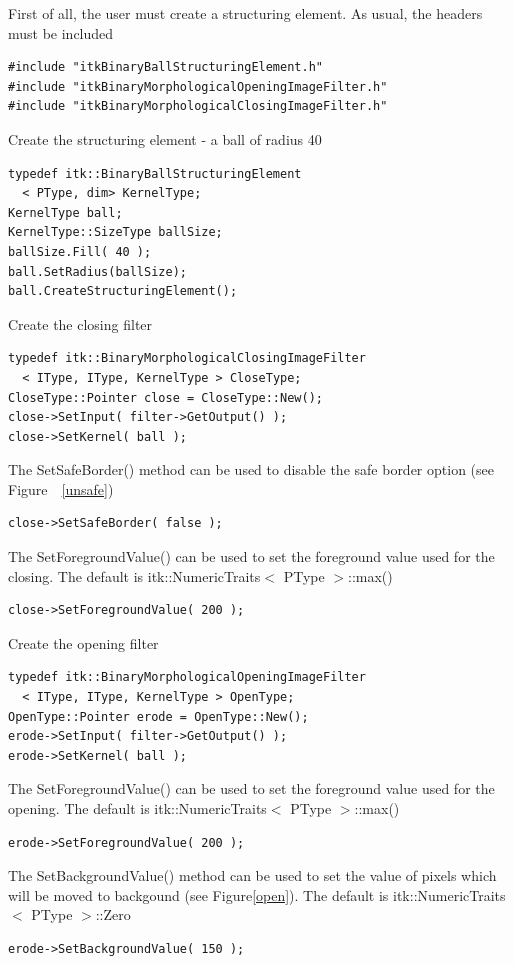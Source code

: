 \documentclass[IJ]{cesj}
\begin{document}
First of all, the user must create a structuring element. As usual, the headers must be included

\begin{lstlisting}
#include "itkBinaryBallStructuringElement.h"
#include "itkBinaryMorphologicalOpeningImageFilter.h"
#include "itkBinaryMorphologicalClosingImageFilter.h"
\end{lstlisting}
Create the structuring element - a ball of radius 40
\begin{lstlisting}
typedef itk::BinaryBallStructuringElement
  < PType, dim> KernelType;
KernelType ball;
KernelType::SizeType ballSize;
ballSize.Fill( 40 );
ball.SetRadius(ballSize);
ball.CreateStructuringElement();
\end{lstlisting}
Create the closing filter
\begin{lstlisting}
typedef itk::BinaryMorphologicalClosingImageFilter
  < IType, IType, KernelType > CloseType;
CloseType::Pointer close = CloseType::New();
close->SetInput( filter->GetOutput() );
close->SetKernel( ball );
\end{lstlisting}
The SetSafeBorder() method can be used to disable the safe border option (see Figure~~\ref{unsafe})
\begin{lstlisting}
close->SetSafeBorder( false );
\end{lstlisting}
The SetForegroundValue() can be used to set the foreground value used for the closing. The default is itk::NumericTraits$<$ PType $>$::max()
\begin{lstlisting}
close->SetForegroundValue( 200 );
\end{lstlisting}
Create the opening filter
\begin{lstlisting}
typedef itk::BinaryMorphologicalOpeningImageFilter
  < IType, IType, KernelType > OpenType;
OpenType::Pointer erode = OpenType::New();
erode->SetInput( filter->GetOutput() );
erode->SetKernel( ball );
\end{lstlisting}
The SetForegroundValue() can be used to set the foreground value used for the opening. The default is itk::NumericTraits$<$ PType $>$::max()
\begin{lstlisting}
erode->SetForegroundValue( 200 );
\end{lstlisting}
The SetBackgroundValue() method can be used to set the value of pixels which will be moved to backgound (see Figure\ref{open}). The default is itk::NumericTraits$<$ PType $>$::Zero
\begin{lstlisting}
erode->SetBackgroundValue( 150 );
\end{lstlisting}
\end{document}

